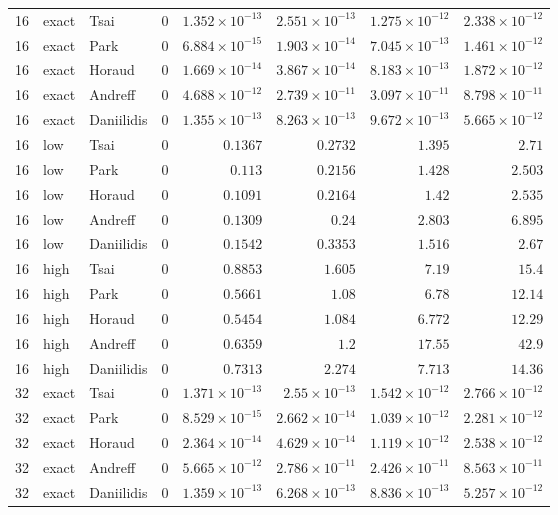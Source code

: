 \begin{longtable}{rllrrrrr}
16 & exact & Tsai & 0 & $1.352\times10^{-13}$ & $2.551\times10^{-13}$ & $1.275\times10^{-12}$ & $2.338\times10^{-12}$ \\
16 & exact & Park & 0 & $6.884\times10^{-15}$ & $1.903\times10^{-14}$ & $7.045\times10^{-13}$ & $1.461\times10^{-12}$ \\
16 & exact & Horaud & 0 & $1.669\times10^{-14}$ & $3.867\times10^{-14}$ & $8.183\times10^{-13}$ & $1.872\times10^{-12}$ \\
16 & exact & Andreff & 0 & $4.688\times10^{-12}$ & $2.739\times10^{-11}$ & $3.097\times10^{-11}$ & $8.798\times10^{-11}$ \\
16 & exact & Daniilidis & 0 & $1.355\times10^{-13}$ & $8.263\times10^{-13}$ & $9.672\times10^{-13}$ & $5.665\times10^{-12}$ \\
16 & low & Tsai & 0 & $0.1367$ & $0.2732$ & $1.395$ & $2.71$ \\
16 & low & Park & 0 & $0.113$ & $0.2156$ & $1.428$ & $2.503$ \\
16 & low & Horaud & 0 & $0.1091$ & $0.2164$ & $1.42$ & $2.535$ \\
16 & low & Andreff & 0 & $0.1309$ & $0.24$ & $2.803$ & $6.895$ \\
16 & low & Daniilidis & 0 & $0.1542$ & $0.3353$ & $1.516$ & $2.67$ \\
16 & high & Tsai & 0 & $0.8853$ & $1.605$ & $7.19$ & $15.4$ \\
16 & high & Park & 0 & $0.5661$ & $1.08$ & $6.78$ & $12.14$ \\
16 & high & Horaud & 0 & $0.5454$ & $1.084$ & $6.772$ & $12.29$ \\
16 & high & Andreff & 0 & $0.6359$ & $1.2$ & $17.55$ & $42.9$ \\
16 & high & Daniilidis & 0 & $0.7313$ & $2.274$ & $7.713$ & $14.36$ \\
32 & exact & Tsai & 0 & $1.371\times10^{-13}$ & $2.55\times10^{-13}$ & $1.542\times10^{-12}$ & $2.766\times10^{-12}$ \\
32 & exact & Park & 0 & $8.529\times10^{-15}$ & $2.662\times10^{-14}$ & $1.039\times10^{-12}$ & $2.281\times10^{-12}$ \\
32 & exact & Horaud & 0 & $2.364\times10^{-14}$ & $4.629\times10^{-14}$ & $1.119\times10^{-12}$ & $2.538\times10^{-12}$ \\
32 & exact & Andreff & 0 & $5.665\times10^{-12}$ & $2.786\times10^{-11}$ & $2.426\times10^{-11}$ & $8.563\times10^{-11}$ \\
32 & exact & Daniilidis & 0 & $1.359\times10^{-13}$ & $6.268\times10^{-13}$ & $8.836\times10^{-13}$ & $5.257\times10^{-12}$ \\

\end{longtable}
